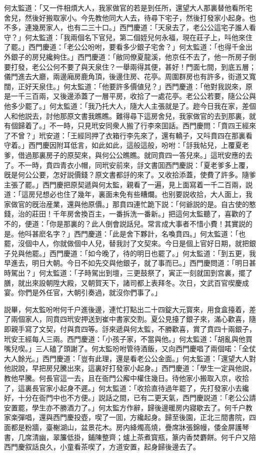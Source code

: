 何太監道：「又一件相煩大人，我家做官的若是到任所，還望大人那裏替他看所宅舍兒，然後好搬取家小。今先教他同大人去，待尋下宅子，然後打發家小起身。也不多，連幾房家人，也有二三十口。」西門慶道：「天泉去了，老公公這宅子誰人看守？」何太監道：「我兩個名下官兒，第二個姪兒何永福，現在莊子上，呌他來住了罷。」西門慶道：「老公公吩咐，要看多少銀子宅舍？」何太監道：「也得千金出外銀子的房兒纔夠住。」西門慶道：「敝同僚夏龍溪，他京任不去了，他一所房子倒要打發，老公公何不要了與天泉住？一舉兩得其便，甚好！門面七間，到底五層；儀門進去大廳，兩邊廂房鹿角頂，後邊住房、花亭。周圍群房也有許多，街道又寬闊，正好天泉住。」何太監道：「他要許多價値兒？」西門慶道：「他對我説來，原是一千三百兩，又後邊添蓋了一層平房，收拾了一處花亭。老公公若要，隨公公與他多少罷了。」何太監道：「我乃托大人，隨大人主張就是了。趂今日我在家，差個人和他説去，討他那原文書我瞧瞧。難得尋下這房舍兒，我家做官的去到那裏，就有個歸着了。」不一時，只見玳安同衆人搬了行李來囬話。西門慶問：「賁四王經來了不曾？」玳安道：「王經同押了衣箱行李先來了，還有轎子，又呌賁四在那裏看守着。」西門慶因附耳低言，如此如此，這般這般，吩咐：「㧱我帖兒，上覆夏老爹，借過那裏房子的原契來，與何公公瞧瞧。就同賁四一答兒來。」這玳安應的去了。不一時，賁四青衣小帽，同玳安前來，㧱文書囬西門慶説：「夏老爹多上覆，旣是何公公要，怎好説價錢？原文書都㧱的來了。又收拾添蓋，使費了許多。隨爹主張了罷。」西門慶把原契遞與何太監，親看了一遍，見上面寫着一千二百兩，説道：「這房兒想必也住了幾年，裏面未免有些糟爛。也别要説收拾，大人面上，我家做官的旣治産業，還與他原價。」那賁四連忙跪下説：「何爺説的是。自古使的憨錢，治的莊田！千年房舍換百主，一番拆洗一番新。」把這何太監聽了，喜歡的了不的，便道：「你是那裏的？此人倒會説話兒。常言成大事者不惜小費！其實説的是。他呌甚麽名字？」西門慶道：「此是舍下夥計，名喚賁四。」何太監道：「也罷，沒個中人，你就做個中人兒，替我討了文契來。今日是個上官好日期，就把銀子兑與他罷。」西門慶道：「如今晚了，待的明日也罷了。」何太監道：「到五更，我早進去，明日大朝。今日不如先交與他銀子，就了事而已。」西門慶問道：「明日甚時駕出？」何太監道：「子時駕出到壇，三更鼓祭了，寅正一刻就囬到宫裏，擺了膳，就出來設朝陞大殿，又朝賀天下，諸司都上表拜冬。次日，文武百官喫慶成宴。你們是外任官，大朝引奏過，就沒你們事了。」

説畢，何太監吩咐何千户進後邊，連忙打點出二十四錠大元寳來，用食盒擡着，差了兩個家人，同賁四玳安押送到崔中書家交割。夏公見擡了銀子來，滿心歡喜，隨即親手寫了文契，付與賁四等。㧱來遞與何太監，不勝歡喜，賞了賁四十兩銀子，玳安王經每人三兩。西門慶道：「小孩子家，不當與他。」何太監道：「胡亂與他買嘴兒喫。」三人磕了頭謝了。何太監吩咐管待酒飯，又向西門慶唱了兩個喏：「全仗大人餘光。」西門慶道：「豈有此理，還是看老公公金面。」何太監道：「還望大人對他説說，早把房兒騰出來，這裏好打發家小起身。」西門慶道：「學生一定與他説，教他早騰。何長官這一去，且在衙門公廨中權住幾日。待他家小搬取入京，收拾了，這裏長官家小起身不遲。」何太監道：「收拾直待過年罷了，先打發家小去纔好，十分在衙門中也不方便。」説話之間，已有二更天氣，西門慶説道：「老公公請安置罷，學生亦不勝酒力了。」何太監方作辭，歸後邊暖房内寢歇去了。何千户教家楽彈唱，還與西門慶投壺，喫了一囬，方纔起身。歸至後園，正北三間書院，四面都是粉牆，臺榭湖山，盆景花木。房内絳燭高燒，疊席牀張錦幔，倭金屏護琴書，几席清幽，翠簾低掛，鋪陳整齊；爐上茶煮寳瓶，篆内香焚麝餅。何千户又陪西門慶叙話良久，小童看茶喫了，方道安置，起身歸後邊去了。

